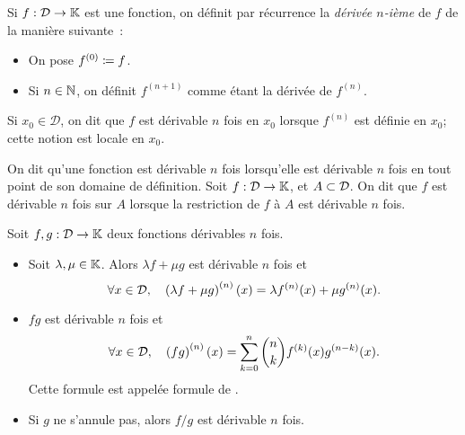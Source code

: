 \documentclass{magnolia}
\begin{document}
\begin{definition}[utile=-3]
Si $f:\mathcal{D}\to\mathbb{K}$ est une fonction, on définit par récurrence
la \emph{dérivée $n$-ième} de $f$ de la manière suivante~:
\begin{itemize}
\item On pose $f^{(0)}\coloneqq f$.
\item Si $n\in\mathbb{N}$, on définit $f^{(n+1)}$ comme étant la dérivée  de $f^{(n)}$.
\end{itemize}
Si $x_0\in\mathcal{D}$, on dit que $f$ est dérivable $n$ fois en $x_0$
lorsque $f^{(n)}$ est définie en $x_0$; cette notion est locale en $x_0$.
\end{definition}

\begin{remarques}
\remarque On dit qu'une fonction est dérivable $n$ fois lorsqu'elle est
  dérivable $n$ fois en tout point de son domaine de définition.
\remarque Soit $f:\mathcal{D}\to\mathbb{K}$, et $A\subset\mathcal{D}$. On dit que $f$ est
  dérivable $n$ fois sur $A$ lorsque la restriction de $f$ à $A$ est dérivable
  $n$ fois.
\end{remarques}

\begin{proposition}[utile=-3]
Soit $f, g:\mathcal{D}\to\mathbb{K}$ deux fonctions dérivables $n$ fois.
\begin{itemize}
\item Soit $\lambda,\mu\in\mathbb{K}$. Alors $\lambda f+\mu g$ est dérivable $n$
  fois et
  \[\forall x\in\mathcal{D} ,\quad
    \left(\lambda f+\mu g\right)^{(n)}(x)=\lambda f^{(n)}(x)+\mu g^{(n)}(x).\]
\item $fg$ est dérivable $n$ fois et
  \[\forall x\in \mathcal{D} ,\quad
    \left(fg\right)^{(n)}(x)=\sum_{k=0}^n \binom{n}{k} f^{(k)}(x)g^{(n-k)}(x).\]
  Cette formule est appelée formule de .
\item Si $g$ ne s'annule pas, alors $f/g$ est dérivable $n$ fois.
\end{itemize}
\end{proposition}
\end{document}
